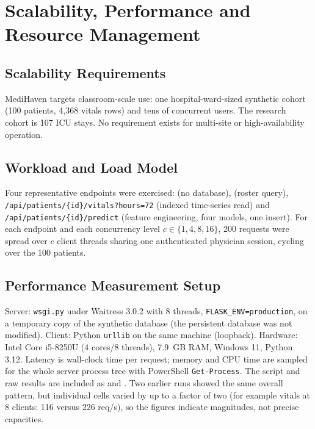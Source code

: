 \chapter{Scalability, Performance and Resource Management}
\label{ch:scal}

\section{Scalability Requirements}
MediHaven targets classroom-scale use: one hospital-ward-sized synthetic cohort (100 patients, 4{,}368
vitals rows) and tens of concurrent users. The research cohort is 107 ICU stays. No requirement exists for
multi-site or high-availability operation.

\section{Workload and Load Model}
Four representative endpoints were exercised:  (no database), 
(roster query), \texttt{/api/patients/\{id\}/vitals?hours=72} (indexed time-series read) and
\texttt{/api/patients/\{id\}/predict} (feature engineering, four models, one insert). For each endpoint
and each concurrency level $c\in\{1,4,8,16\}$, 200 requests were spread over $c$ client threads sharing
one authenticated physician session, cycling over the 100 patients.

\section{Performance Measurement Setup}
Server: \texttt{wsgi.py} under Waitress 3.0.2 with 8 threads, \texttt{FLASK\_ENV=production}, on a
temporary copy of the synthetic database (the persistent database was not modified). Client: Python
\texttt{urllib} on the same machine (loopback). Hardware: Intel Core i5-8250U (4 cores/8 threads),
7.9~GB RAM, Windows 11, Python 3.12. Latency is wall-clock time per request; memory and CPU time are
sampled for the whole server process tree with PowerShell \texttt{Get-Process}. The script and raw results
are included as  and . Two
earlier runs showed the same overall pattern, but individual cells varied by up to a factor of two (for
example vitals at 8 clients: 116 versus 226 req/s), so the figures indicate magnitudes, not precise
capacities.

